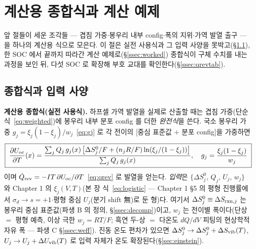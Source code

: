 \section{계산용 종합식과 계산 예제}\label{sec:synthesis}

앞 절들이 세운 조각들 --- 겹침 가중$\cdot$봉우리 내부 config$\cdot$폭의 지위$\cdot$가역 발열 출구 --- 을 하나의
계산용 식으로 모은다. 이 절은 실전 사용식과 그 입력 사양을 못박고(\S\ref{ssec:synth}), 한 SOC 에서 끝까지
따라간 계산 예제로(\S\ref{ssec:worked}) 종합식이 구체 수치를 내는 과정을 보인 뒤, 다섯 SOC 로 확장해 부호
교대를 확인한다(\S\ref{ssec:qrevtab}).

\subsection{종합식과 입력 사양}\label{ssec:synth}
\begin{keybox}
\textbf{계산용 종합식(실전 사용식).} 하프셀 가역 발열을 실제로 산출할 때는 겹침 가중(단순식~\eqref{eq:weighted})에
봉우리 내부 분포 config 를 더한 \emph{완전식}을 쓴다. 국소 봉우리 가중 $g_j=\xi_j(1-\xi_j)/w_j$~\eqref{eq:gj}
로 각 전이의 [중심 표준값 $+$ 분포 config]을 가중하면
\begin{equation}
\boxed{\;\frac{\partial U_{\mathrm{oc}}}{\partial T}(x)
=\frac{\sum_j Q_j\,g_j(x)\,\bigl[\Delta S^0_j/F+(n_jR/F)\ln(\xi_j/(1-\xi_j))\bigr]}{\sum_j Q_j\,g_j(x)},\quad
g_j=\frac{\xi_j(1-\xi_j)}{w_j}\;}
\label{eq:complete}
\end{equation}
이며 $\dot Q_{\mathrm{rev}}=-IT\,\partial U_{\mathrm{oc}}/\partial T$~\eqref{eq:qrev} 로 발열을 얻는다. \emph{입력}은
$\{\Delta S^0_j,\,Q_j,\,U_j,\,w_j\}$ 와 Chapter 1 의 $\xi_j(V,T)$(본 장 식~\eqref{eq:logistic} --- Chapter 1 §5
의 평형 진행률에서 $\sigma_d\to s{=}+1$$\cdot$평형 중심 $U_j$(분기 shift 無)로 둔 형)다. 여기서
$\Delta S^0_j\equiv\Delta S_{\mathrm{rxn},j}$ 는 봉우리 중심 표준값(파생 B 의 정의, \S\ref{ssec:decomp})이고, $w_j$ 는
전이별 폭이다(단상 $=$ 평형 예측, 이상 극한 $w_j{=}RT/F$; 흑연 두-상 $=$ 다온도 $dQ/dV$ 피팅의 현상학적 자유
폭 --- 파생 C \S\ref{ssec:weff}). 진동 온도 편차가 있으면 $\Delta S^0_j\to\Delta S^0_j+\Delta S_{\mathrm{vib}}(T)$,
$U_j\to U_j+\Delta U_{\mathrm{vib}}(T)$ 로 입력 자체가 온도 확장된다(\S\ref{sec:einstein}).
\end{keybox}

